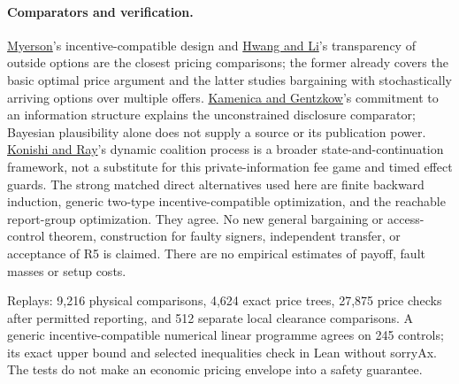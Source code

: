 \documentclass{article}
\begin{document}
\paragraph{Comparators and verification.}
\href{https://www.cs.princeton.edu/courses/archive/spring09/cos444/papers/myerson81.pdf}{Myerson}'s incentive-compatible design and \href{https://doi.org/10.1016/j.jet.2016.10.008}{Hwang and Li}'s transparency of outside options are the closest pricing comparisons; the former already covers the basic optimal price argument and the latter studies bargaining with stochastically arriving options over multiple offers. \href{https://web.stanford.edu/~gentzkow/research/BayesianPersuasion.pdf}{Kamenica and Gentzkow}'s commitment to an information structure explains the unconstrained disclosure comparator; Bayesian plausibility alone does not supply a source or its publication power. \href{https://pages.nyu.edu/debraj/Papers/KonishiRay.pdf}{Konishi and Ray}'s dynamic coalition process is a broader state-and-continuation framework, not a substitute for this private-information fee game and timed effect guards. The strong matched direct alternatives used here are finite backward induction, generic two-type incentive-compatible optimization, and the reachable report-group optimization. They agree. No new general bargaining or access-control theorem, construction for faulty signers, independent transfer, or acceptance of R5 is claimed. There are no empirical estimates of payoff, fault masses or setup costs.

Replays: 9,216 physical comparisons, 4,624 exact price trees, 27,875 price checks after permitted reporting, and 512 separate local clearance comparisons. A generic incentive-compatible numerical linear programme agrees on 245 controls; its exact upper bound and selected inequalities check in Lean without sorryAx. The tests do not make an economic pricing envelope into a safety guarantee.
\end{document}
